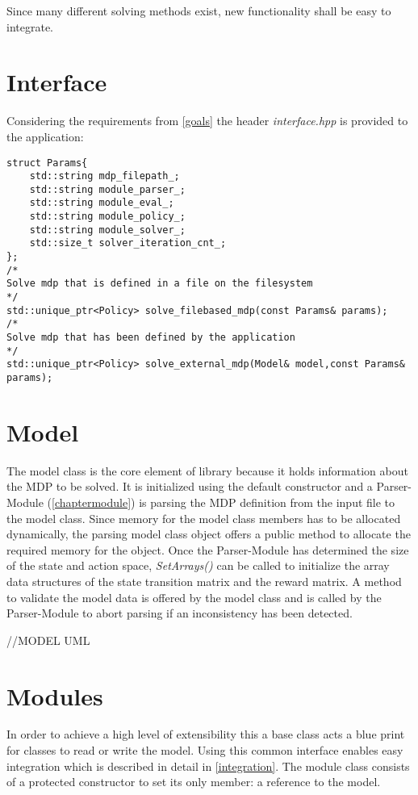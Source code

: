 Since many different solving methods exist, new functionality shall be easy to integrate.

\section{Interface}

Considering the requirements from \autoref{goals} the header \emph{interface.hpp} is provided to the application:

\begin{lstlisting}
struct Params{
	std::string mdp_filepath_;
	std::string module_parser_;
	std::string module_eval_;
	std::string module_policy_;
	std::string module_solver_;
	std::size_t solver_iteration_cnt_;
};
/*
Solve mdp that is defined in a file on the filesystem
*/
std::unique_ptr<Policy> solve_filebased_mdp(const Params& params);
/*
Solve mdp that has been defined by the application
*/
std::unique_ptr<Policy> solve_external_mdp(Model& model,const Params& params);

\end{lstlisting}


\section{Model}

The model class is the core element of library because it holds information about the MDP to be solved. It is initialized using the default constructor and a Parser-Module (\autoref{chaptermodule}) is parsing the MDP definition from the input file to the model class. Since memory for the model class members has to be allocated dynamically, the parsing model class object offers a public method to allocate the required memory for the object. Once the Parser-Module has determined the size of the state and action space, \emph{SetArrays()} can be called to initialize the array data structures of the state transition matrix and the reward matrix. A method to validate the model data is offered by the model class and is called by the Parser-Module to abort parsing if an inconsistency has been detected. 

//MODEL UML

\section{Modules}
\label{chaptermodule}

In order to achieve a high level of extensibility this a base class acts a blue print for classes to read or write the model. Using this common interface enables easy integration which is described in detail in \autoref{integration}. The module class consists of a protected constructor to set its only member: a reference to the model. 

